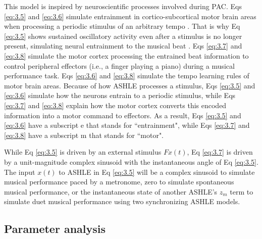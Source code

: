 \documentclass{report}
\begin{document}
This model is inspired by neuroscientific processes involved during PAC. Eqs \eqref{eq:3.5} and \eqref{eq:3.6} simulate entrainment in cortico-subcortical motor brain areas when processing a periodic stimulus of an arbitrary tempo \cite{daly2014changes, grahn2009feeling, grahn2013finding}. That is why Eq \eqref{eq:3.5} shows sustained oscillatory activity even after a stimulus is no longer present, simulating neural entrainment to the musical beat \cite{large2015neural}. Eqs \eqref{eq:3.7} and \eqref{eq:3.8} simulate the motor cortex processing the entrained beat information to control peripheral effectors (i.e., a finger playing a piano) during a musical performance task. Eqs \eqref{eq:3.6} and \eqref{eq:3.8} simulate the tempo learning rules of motor brain areas. Because of how ASHLE processes a stimulus, Eqs \eqref{eq:3.5} and \eqref{eq:3.6} simulate how the neurons entrain to a periodic stimulus, while Eqs \eqref{eq:3.7} and \eqref{eq:3.8} explain how the motor cortex converts this encoded information into a motor command to effectors. As a result, Eqs \eqref{eq:3.5} and \eqref{eq:3.6} have a subscript e that stands for ``entrainment", while Eqs \eqref{eq:3.7} and \eqref{eq:3.8} have a subscript m that stands for ``motor".

While Eq \eqref{eq:3.5} is driven by an external stimulus $Fx(t)$, Eq \eqref{eq:3.7} is driven by a unit-magnitude complex sinusoid with the instantaneous angle of Eq \eqref{eq:3.5}. The input $x(t)$ to ASHLE in Eq \eqref{eq:3.5} will be a complex sinusoid to simulate musical performance paced by a metronome, zero to simulate spontaneous musical performance, or the instantaneous state of another ASHLE's $z_m$ term to simulate duet musical performance using two synchronizing ASHLE models.

\subsection{Parameter analysis}
\end{document}
